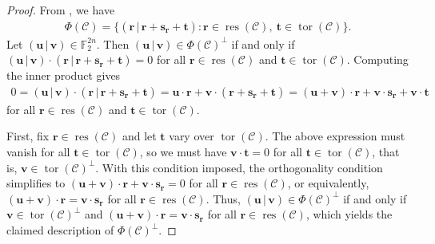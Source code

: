 \documentclass[12pt]{article}
\theoremstyle{definition}
\theoremstyle{plain}
\begin{document}
\begin{proof}
From , we have
\begin{align*}
\Phi(\mathcal{C})
=
\{
(\mathbf{r} \, |  \,  \mathbf{r} + \mathbf{s}_{\mathbf{r}} + \mathbf{t})
\mathrel{:}
\mathbf{r} \in \operatorname{res}(\mathcal{C})  ,  \
\mathbf{t} \in \operatorname{tor}(\mathcal{C})
\}  .
\end{align*}
Let $(\mathbf{u} \, | \, \mathbf{v}) \in \mathbb{F}_2^{2n}$. Then
$(\mathbf{u} \, | \, \mathbf{v}) \in \Phi(\mathcal{C})^\perp$ if and only if
$
(\mathbf{u} \, | \,  \mathbf{v})
\cdot
(\mathbf{r} \, |  \,  \mathbf{r} + \mathbf{s}_{\mathbf{r}} + \mathbf{t})
= 0
$
for all $\mathbf{r} \in \operatorname{res}(\mathcal{C})$ and $\mathbf{t} \in \operatorname{tor}(\mathcal{C})$. Computing the inner product
gives
\begin{align*}
0
=
(\mathbf{u} \, | \,  \mathbf{v})
\cdot
(\mathbf{r} \, |  \,  \mathbf{r} + \mathbf{s}_{\mathbf{r}} + \mathbf{t})    %
=
\mathbf{u} \cdot \mathbf{r}
+
\mathbf{v} \cdot (\mathbf{r} + \mathbf{s}_{\mathbf{r}} + \mathbf{t})   %
=
(\mathbf{u} + \mathbf{v}) \cdot \mathbf{r}
+
\mathbf{v} \cdot \mathbf{s}_{\mathbf{r}}
+
\mathbf{v} \cdot \mathbf{t}
\end{align*}
for all $\mathbf{r} \in \operatorname{res}(\mathcal{C})$ and $\mathbf{t} \in \operatorname{tor}(\mathcal{C})$.

First, fix $\mathbf{r} \in \operatorname{res}(\mathcal{C})$ and let $\mathbf{t}$ vary over $\operatorname{tor}(\mathcal{C})$. The above
expression must vanish for all $\mathbf{t} \in \operatorname{tor}(\mathcal{C})$, so we must have
$\mathbf{v} \cdot \mathbf{t} = 0$ for all $\mathbf{t} \in \operatorname{tor}(\mathcal{C})$, that is,
$
\mathbf{v} \in \operatorname{tor}(\mathcal{C})^\perp.
$
With this condition imposed, the orthogonality condition simplifies to
$
(\mathbf{u} + \mathbf{v}) \cdot \mathbf{r}
+
\mathbf{v} \cdot \mathbf{s}_{\mathbf{r}}
=
0
$
for all $\mathbf{r} \in \operatorname{res}(\mathcal{C})$,
or equivalently,
$
(\mathbf{u} + \mathbf{v}) \cdot \mathbf{r}
=
\mathbf{v} \cdot \mathbf{s}_{\mathbf{r}}
$
for all $\mathbf{r} \in \operatorname{res}(\mathcal{C})$.
Thus, $(\mathbf{u} \, | \, \mathbf{v}) \in \Phi(\mathcal{C})^\perp$ if and only if
$\mathbf{v} \in \operatorname{tor}(\mathcal{C})^\perp$ and
$
(\mathbf{u} + \mathbf{v}) \cdot \mathbf{r}
=
\mathbf{v} \cdot \mathbf{s}_{\mathbf{r}}
$
for all  $\mathbf{r} \in \operatorname{res}(\mathcal{C})
$,
which yields the claimed description of $\Phi(\mathcal{C})^\perp$.


\end{proof}
\end{document}
